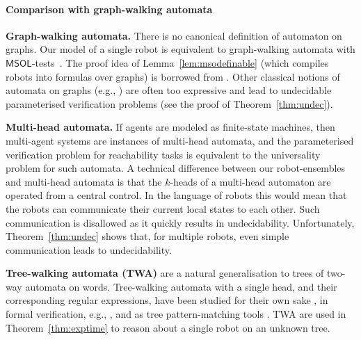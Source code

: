 \documentclass{aamas2015}
\def\msol{\mathsf{MSOL}}
\begin{document}


\paragraph{Comparison with graph-walking automata}
%
{\bf Graph-walking automata.} There is no canonical definition of automaton on graphs. Our model of a single robot is equivalent to graph-walking automata with $\msol$-tests~\cite{BlEn97}. The proof idea of Lemma~\ref{lem:msodefinable} (which compiles robots into formulas over graphs) is borrowed from \cite{BlEn97, EnHo06}. Other classical notions of automata on graphs (e.g., \cite{BlHe67}) are often too expressive and lead to undecidable parameterised verification problems (see the proof of Theorem~\ref{thm:undec}). 


{\bf Multi-head automata.} If agents are modeled as finite-state machines, then multi-agent systems are instances of multi-head automata, and the parameterised verification problem for reachability tasks is equivalent to the universality problem for such automata.  A technical difference between our robot-ensembles and multi-head automata is that the $k$-heads of a multi-head automaton are operated from a central control. In the language of robots this would mean that the robots can communicate their current local states to each other. Such communication is disallowed as it quickly results in undecidability. Unfortunately, Theorem~\ref{thm:undec} shows that, for multiple robots, even simple communication leads to undecidability.

{\bf Tree-walking automata (TWA)} are a natural generalisation to trees of two-way automata on words. Tree-walking automata with a single head, and their corresponding regular expressions, have been studied for their own sake \cite{Boja08}, in formal verification, e.g., \cite{Vardi98,BLMV08,Obdr13}, and as tree pattern-matching tools \cite{BrWo00, Schw12}. TWA are used in Theorem~\ref{thm:exptime} to reason about a single robot on an unknown tree.

\end{document}
